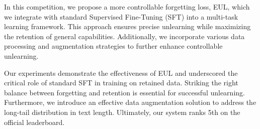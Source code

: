 \documentclass[11pt]{article}
\begin{document}

In this competition, we propose a more controllable forgetting loss, EUL, which we integrate with standard Supervised Fine-Tuning (SFT) into a multi-task learning framework. This approach ensures precise unlearning while maximizing the retention of general capabilities. Additionally, we incorporate various data processing and augmentation strategies to further enhance controllable unlearning.

Our experiments demonstrate the effectiveness of EUL and underscored the critical role of standard SFT in training on retained data. Striking the right balance between forgetting and retention is essential for successful unlearning. Furthermore, we introduce an effective data augmentation solution to address the long-tail distribution in text length. Ultimately, our system ranks 5th on the official leaderboard.



\end{document}
